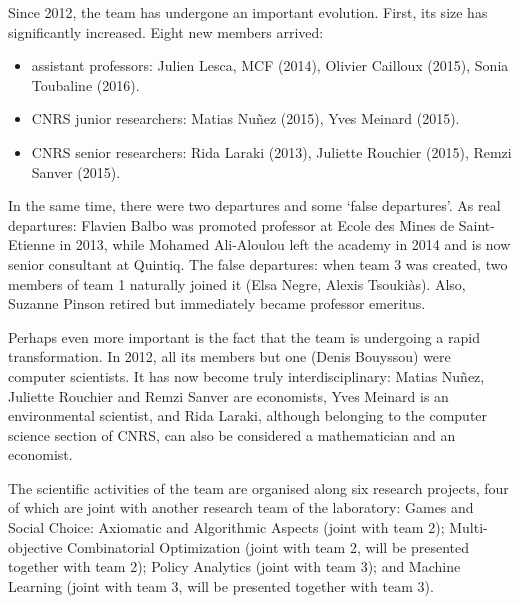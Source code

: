 Since 2012, the team has undergone an important evolution. First, its size has significantly increased. Eight new members arrived:

\begin{itemize}
\item assistant professors: Julien Lesca, MCF (2014), Olivier Cailloux (2015), Sonia Toubaline (2016).
\item CNRS junior researchers: Matias Nu\~{n}ez (2015), Yves Meinard (2015).
\item CNRS senior researchers: Rida Laraki (2013), Juliette Rouchier (2015),  Remzi Sanver (2015).
\end{itemize}

In the same time, there were two departures and some `false departures'. As real departures: Flavien Balbo was promoted professor at Ecole des Mines de Saint-Etienne in 2013, while Mohamed Ali-Aloulou left the academy in 2014 and is now senior consultant at Quintiq. The false departures: when team 3 was created, two members of team 1 naturally joined it (Elsa Negre, Alexis Tsouki\`as). Also, Suzanne Pinson retired but immediately became professor emeritus. 

Perhaps even more important is the fact that the team is undergoing a rapid transformation. In 2012, all its members but one (Denis Bouyssou) were computer scientists. It has now become truly interdisciplinary: Matias Nu\~{n}ez, Juliette Rouchier and Remzi Sanver are economists, Yves Meinard 
is an environmental scientist, and Rida Laraki, although belonging to the computer science section of CNRS, can also be considered a mathematician and an economist. 

The scientific activities of the team are organised along six research projects, four of which are joint with another research team of the laboratory: Games and Social Choice: Axiomatic and Algorithmic Aspects (joint with team 2); Multi-objective Combinatorial Optimization (joint with team 2, will be presented together with team 2); Policy Analytics (joint with team 3); and Machine Learning (joint with team  3, will be presented together with team 3).

